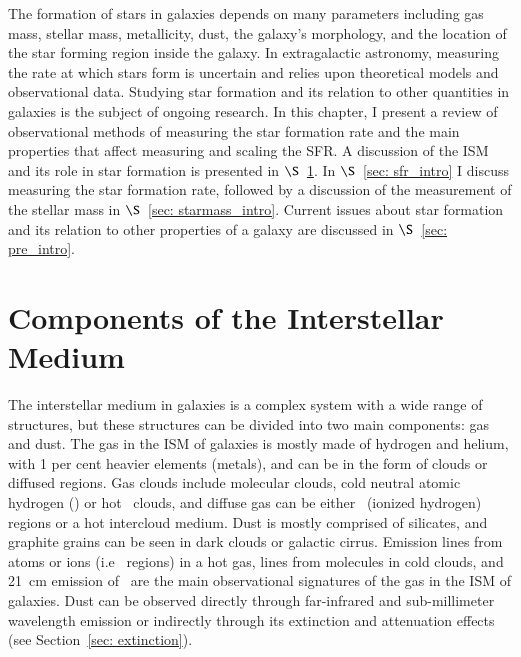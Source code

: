The formation of stars in galaxies depends on many parameters including gas mass, stellar mass, metallicity, dust, the galaxy's morphology, and the location of the star forming region inside the galaxy.
In extragalactic astronomy, measuring the rate at which stars form is uncertain and relies upon theoretical models and observational data.
Studying star formation and its relation to other quantities in galaxies is the subject of ongoing research.
In this chapter, I present a review of observational methods of measuring the star formation rate and the main properties that affect measuring and scaling the SFR. A discussion of the ISM and its role in star formation is presented in $\S$~\ref{sec: ism_intro}. In $\S$~\ref{sec: sfr_intro} I discuss measuring the star formation rate, followed by a discussion of the measurement of the stellar mass in $\S$~\ref{sec: starmass_intro}. Current issues about star formation and its relation to other properties of a galaxy are discussed in $\S$~\ref{sec: pre_intro}. 





\section{Components of the Interstellar Medium} 
\label{sec: ism_intro}
The interstellar medium in galaxies is a complex system with a wide range of structures, but these structures can be divided into two main components: gas and dust.
The gas in the ISM of galaxies is mostly made of hydrogen and helium, with 1 per cent heavier elements (metals), and can be in the form of clouds or diffused regions.
Gas clouds include molecular clouds, cold neutral atomic hydrogen (\hi) or hot \hi~clouds, and diffuse gas can be either \hii~(ionized hydrogen) regions or a hot intercloud medium.
Dust is mostly comprised of silicates, and graphite grains can be seen in dark clouds or galactic cirrus.
Emission lines from atoms or ions (i.e \hii~regions) in a hot gas, lines from molecules in cold clouds, and 21~cm emission of \hi~are the main observational signatures of the gas in the ISM of galaxies.
Dust can be observed directly through far-infrared and sub-millimeter wavelength emission or indirectly through its extinction and attenuation effects (see Section~\ref{sec: extinction}).

